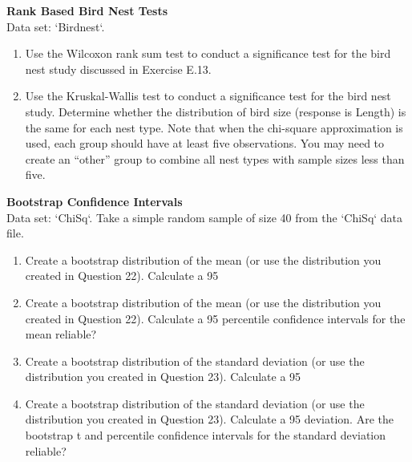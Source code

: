 \documentclass[
]{report}
\theoremstyle{definition}
\theoremstyle{definition}
\theoremstyle{definition}
\theoremstyle{definition}
\theoremstyle{remark}
\begin{document}
\begin{list}{E.}{ \setlength{\itemsep}{0.5em}}
  
  
  
  \item \textbf{Rank Based Bird Nest Tests} \\
  Data set: `Birdnest`. 
  \begin{enumerate}
    \setcounter{enumi}{0}  
    \item Use the Wilcoxon rank sum test to conduct a significance test for the bird nest study discussed in
Exercise E.13.
    \item Use the Kruskal-Wallis test to conduct a significance test for the bird nest study. Determine
whether the distribution of bird size (response is Length) is the same for each nest type. Note
that when the chi-square approximation is used, each group should have at least five observations.
You may need to create an “other” group to combine all nest types with sample sizes less
than five.
  \end{enumerate}
  
  
  
  
  \item \textbf{Bootstrap Confidence Intervals} \\
  Data set: `ChiSq`. Take a simple random sample of size 40 from the `ChiSq` data file.
  \begin{enumerate}
    \setcounter{enumi}{0}  
    \item Create a bootstrap distribution of the mean (or use the distribution you created in Question 22).
Calculate a 95%
    \item Create a bootstrap distribution of the mean (or use the distribution you created in Question 22).
Calculate a 95%
percentile confidence intervals for the mean reliable?
    \item Create a bootstrap distribution of the standard deviation (or use the distribution you created in
Question 23). Calculate a 95%
    \item Create a bootstrap distribution of the standard deviation (or use the distribution you created
in Question 23). Calculate a 95%
deviation. Are the bootstrap t and percentile confidence intervals for the standard deviation
reliable?
  \end{enumerate}
  
  
  
  
  

\end{list}
\end{document}
